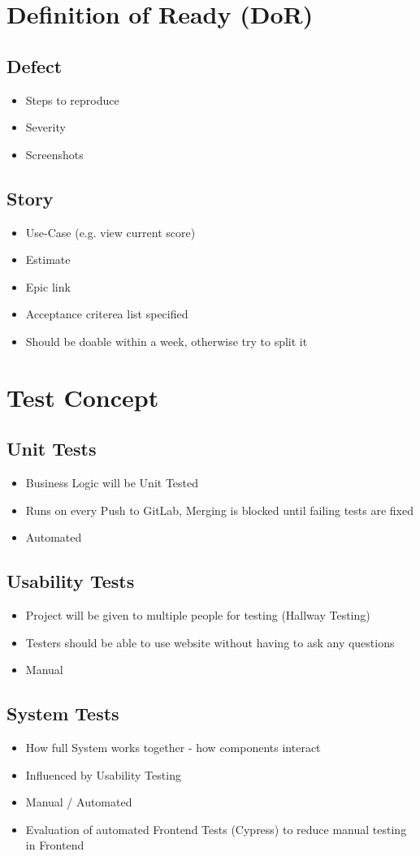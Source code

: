 \section{Definition of Ready (DoR)}

\subsection{Defect} 
\begin{itemize}
    \item Steps to reproduce 
    \item Severity 
    \item Screenshots 
\end{itemize}

\subsection{Story}
\begin{itemize}
    \item Use-Case (e.g. view current score)
    \item Estimate 
    \item Epic link 
    \item Acceptance criterea list specified 
    \item Should be doable within a week, otherwise try to split it 
\end{itemize}


\section{Test Concept}
\subsection{Unit Tests}
\begin{itemize}
    \item Business Logic will be Unit Tested
    \item Runs on every Push to GitLab, Merging is blocked until failing tests are fixed
    \item Automated
\end{itemize}

\subsection{Usability Tests}
\begin{itemize}
    \item Project will be given to multiple people for testing (Hallway Testing)
    \item Testers should be able to use website without having to ask any questions
    \item Manual
\end{itemize}

\subsection{System Tests}
\begin{itemize}
    \item How full System works together - how components interact
    \item Influenced by Usability Testing
    \item Manual / Automated
    \item Evaluation of automated Frontend Tests (Cypress) to reduce manual testing in Frontend
\end{itemize}
